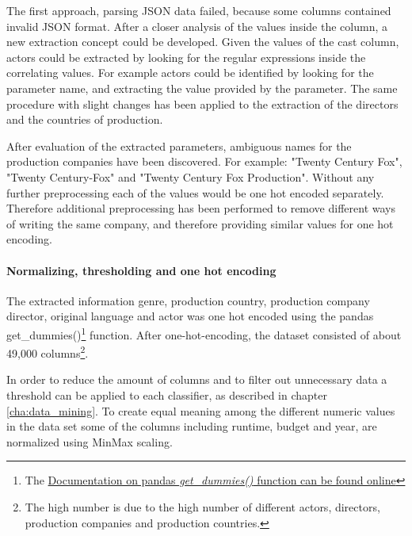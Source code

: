 The first approach, parsing  JSON data failed, because  some columns contained invalid JSON format. After a closer analysis of the values inside the column, a new extraction concept could be developed. Given the values of the cast column, actors could be extracted by looking for the regular expressions inside the correlating values. For example actors could be identified by looking for the parameter name, and extracting the value provided by the parameter. The same procedure with slight changes has been applied to the extraction of the directors and the countries of production.

After evaluation of the extracted parameters, ambiguous names for the production companies have been discovered. For example: "Twenty Century Fox", "Twenty Century-Fox" and "Twenty Century Fox Production". Without any further preprocessing each of the values would be one hot encoded separately. Therefore additional preprocessing has been performed to remove different ways of writing the same company, and therefore providing similar values for one hot encoding.

\paragraph{Normalizing, thresholding and one hot encoding}
The extracted information genre, production country, production company director, original language  and actor was one hot encoded using the pandas get\_dummies()\footnote{The \hyperref{https://pandas.pydata.org/pandas-docs/stable/generated/pandas.get_dummies.html}{documentation}{pd.getDumies}{Documentation on pandas \textit{get\_dummies()} function can be found online}} function. After one-hot-encoding, the dataset consisted of about 49,000 columns\footnote{The high number is due to the high number of different actors, directors, production companies and production countries.}.


In order to reduce the amount of columns and to filter out unnecessary data a threshold can be applied to each classifier, as described in chapter \ref{cha:data_mining}. To create equal meaning among the different numeric values in the data set some of the columns including runtime, budget and year, are normalized using MinMax scaling.




